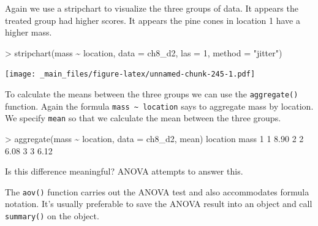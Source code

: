 \documentclass[
]{book}
\newenvironment{Shaded}{\begin{snugshade}}{\end{snugshade}}
\newcommand{\AttributeTok}[1]{\textcolor[rgb]{0.77,0.63,0.00}{#1}}
\newcommand{\DecValTok}[1]{\textcolor[rgb]{0.00,0.00,0.81}{#1}}
\newcommand{\FloatTok}[1]{\textcolor[rgb]{0.00,0.00,0.81}{#1}}
\newcommand{\FunctionTok}[1]{\textcolor[rgb]{0.00,0.00,0.00}{#1}}
\newcommand{\NormalTok}[1]{#1}
\newcommand{\SpecialCharTok}[1]{\textcolor[rgb]{0.00,0.00,0.00}{#1}}
\newcommand{\StringTok}[1]{\textcolor[rgb]{0.31,0.60,0.02}{#1}}
\begin{document}
Again we use a stripchart to visualize the three groups of data. It appears the treated group had higher scores. It appears the pine cones in location 1 have a higher mass.

\begin{Shaded}
\begin{Highlighting}[]
\SpecialCharTok{\textgreater{}} \FunctionTok{stripchart}\NormalTok{(mass }\SpecialCharTok{\textasciitilde{}}\NormalTok{ location, }\AttributeTok{data =}\NormalTok{ ch8\_d2, }\AttributeTok{las =} \DecValTok{1}\NormalTok{, }\AttributeTok{method =} \StringTok{"jitter"}\NormalTok{)}
\end{Highlighting}
\end{Shaded}

\texttt{[image: \_main\_files/figure-latex/unnamed-chunk-245-1.pdf]}

To calculate the means between the three groups we can use the \texttt{aggregate()} function. Again the formula \texttt{mass\ \textasciitilde{}\ location} says to aggregate mass by location. We specify \texttt{mean} so that we calculate the mean between the three groups.

\begin{Shaded}
\begin{Highlighting}[]
\SpecialCharTok{\textgreater{}} \FunctionTok{aggregate}\NormalTok{(mass }\SpecialCharTok{\textasciitilde{}}\NormalTok{ location, }\AttributeTok{data =}\NormalTok{ ch8\_d2, mean)}
\NormalTok{  location mass}
\DecValTok{1}        \DecValTok{1} \FloatTok{8.90}
\DecValTok{2}        \DecValTok{2} \FloatTok{6.08}
\DecValTok{3}        \DecValTok{3} \FloatTok{6.12}
\end{Highlighting}
\end{Shaded}

Is this difference meaningful? ANOVA attempts to answer this.

The \texttt{aov()} function carries out the ANOVA test and also accommodates formula notation. It's usually preferable to save the ANOVA result into an object and call \texttt{summary()} on the object.
\end{document}
